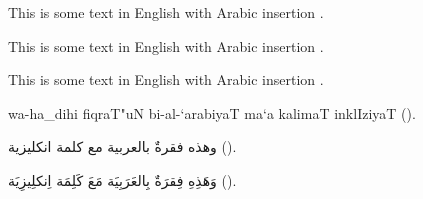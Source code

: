 \documentclass{minimal}
\begin{document}
This is some text in English with Arabic insertion .

This is some text in English with Arabic insertion .

This is some text in English with Arabic insertion .

\begin{arab}
wa-ha_dihi fiqraT"uN bi-al-`arabiyaT ma`a kalimaT inklIziyaT ().
\end{arab}

\begin{arab}[utf]
وهذه فقرةٌ بالعربية مع كلمة انكليزية ().
\end{arab}

\begin{arab}[novoc]
وَهَذِهِ فِقرَةٌ بِالعَرَبِيَة مَعَ كَلِمَة اِنكلِيزِيَة ().
\end{arab}
\end{document}
